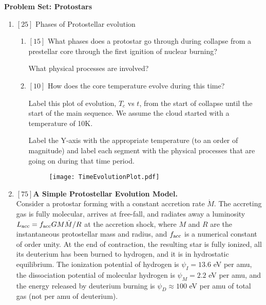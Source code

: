 \documentclass{article}
\begin{document}
\noindent\textbf{Problem Set: Protostars}


\begin{enumerate}


    \item $[25]$ Phases of Protostellar evolution 

        \begin{enumerate}
            \item $[15]$ What phases does a protostar go through during collapse from a prestellar core through the first ignition of nuclear burning?

                What physical processes are involved?

            \item $[10]$ How does the core temperature evolve during this time?

                Label this
                plot of evolution, $T_c$ vs $t$, from the start of
                collapse until the start of the main sequence. We assume the
                cloud started with a temperature of 10K.

                Label the Y-axis with the appropriate temperature (to an order
                of magnitude) and label each segment with the physical
                processes that are going on during that time period.

                \begin{figure}[h!]
                \texttt{[image: TimeEvolutionPlot.pdf]}
                \end{figure}
                


        \end{enumerate}
\item $[75]${\bf A Simple Protostellar Evolution Model.} \\
Consider a protostar forming with a constant accretion rate $\dot{M}$. The
accreting gas is fully molecular, arrives at free-fall, and radiates away a
luminosity $L_{\rm acc} = f_{\rm acc} G M \dot{M}/R$ at the accretion shock,
where $M$ and $R$ are the instantaneous protostellar mass and radius, and
$f_{\rm acc}$ is a numerical constant of order unity. At the end of contraction,
the resulting star is fully ionized, all its deuterium has been burned to
hydrogen, and it is in hydrostatic equilibrium. The ionization potential of
hydrogen is $\psi_I = 13.6$ eV per amu, the dissociation potential of molecular
hydrogen is $\psi_M=2.2$ eV per amu, and the energy released by deuterium
burning is $\psi_D\approx 100$ eV per amu of total gas (not per amu of
deuterium).


\end{enumerate}
\end{document}
